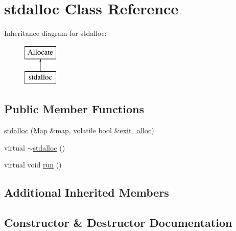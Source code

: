 \hypertarget{classstdalloc}{}\section{stdalloc Class Reference}
\label{classstdalloc}
Inheritance diagram for stdalloc\+:\begin{figure}[H]
\begin{center}
\leavevmode
\includegraphics[height=2.000000cm]{classstdalloc}
\end{center}
\end{figure}
\subsection*{Public Member Functions}
\begin{DoxyCompactItemize}
\item 
\hyperlink{classstdalloc_a5dcbbfb5f2d7b04138c5f74e6c561ffa}{stdalloc} (\hyperlink{class_map}{Map} \&map, volatile bool \&\hyperlink{class_allocate_a4d10076b88ab1297c89b8a05e117b510}{exit\+\_\+alloc})
\item 
virtual \hyperlink{classstdalloc_a46d60193ee113f34caf4ddf4385c9f0d}{$\sim$stdalloc} ()
\item 
virtual void \hyperlink{classstdalloc_a60438b15948ce354b52b03ba6d975de0}{run} ()
\end{DoxyCompactItemize}
\subsection*{Additional Inherited Members}


\subsection{Constructor \& Destructor Documentation}
\hypertarget{classstdalloc_a5dcbbfb5f2d7b04138c5f74e6c561ffa}{}
